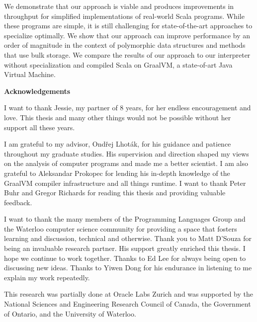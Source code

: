 We demonstrate that our approach is viable and produces improvements in throughput for simplified implementations of real-world Scala programs.
While these programs are simple, it is still challenging for state-of-the-art approaches to specialize optimally.
We show that our approach can improve performance by an order of magnitude in the context of polymorphic data structures and methods that use bulk storage.
We compare the results of our approach to our interpreter without specialization and compiled Scala on GraalVM, a state-of-art Java Virtual Machine.

\cleardoublepage


\begin{center}\textbf{Acknowledgements}\end{center}

I want to thank Jessie, my partner of 8 years, for her endless encouragement and love. This thesis and many other things would not be possible without her support all these years.

I am grateful to my advisor, Ondřej Lhoták, for his guidance and patience throughout my graduate studies.
His supervision and direction shaped my views on the analysis of computer programs and made me a better scientist.
I am also grateful to Aleksandar Prokopec for lending his in-depth knowledge of the GraalVM compiler infrastructure and all things runtime. 
I want to thank Peter Buhr and Gregor Richards for reading this thesis and providing valuable feedback.

I want to thank the many members of the Programming Languages Group and the Waterloo computer science community for providing a space that fosters learning and discussion, technical and otherwise. 
Thank you to Matt D'Souza for being an invaluable research partner. 
His support greatly enriched this thesis. 
I hope we continue to work together. 
Thanks to Ed Lee for always being open to discussing new ideas. 
Thanks to Yiwen Dong for his endurance in listening to me explain my work repeatedly.

This research was partially done at Oracle Labs Zurich and was supported by the National Sciences and Engineering Research Council of Canada, the Government of Ontario, and the University of Waterloo.

\cleardoublepage

\renewcommand\contentsname{Table of Contents}
\tableofcontents
\cleardoublepage
{}    %

\listoffigures
\cleardoublepage
{}		%


